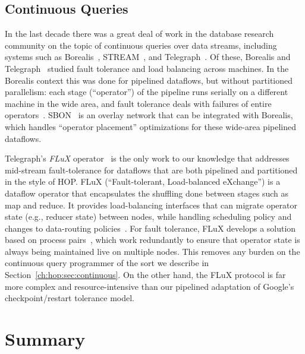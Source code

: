 \subsection{Continuous Queries}
In the last decade there was a great deal of work in the database research
community on the topic of continuous queries over data streams, including
systems such as Borealis~\cite{borealis}, STREAM~\cite{stream}, and
Telegraph~\cite{tcq-cidr}.  Of these, Borealis and Telegraph~\cite{flux-ft}
studied fault tolerance and load balancing across machines.  In the Borealis
context this was done for pipelined dataflows, but without partitioned
parallelism: each stage (``operator'') of the pipeline runs serially on a
different machine in the wide area, and fault tolerance deals with failures of
entire operators~\cite{borealisFT}.  SBON~\cite{sbon} is an overlay network that
can be integrated with Borealis, which handles ``operator placement''
optimizations for these wide-area pipelined dataflows.

Telegraph's \emph{FLuX} operator~\cite{flux-ft,flux-lb} is the only work to our
knowledge that addresses mid-stream fault-tolerance for dataflows that are both
pipelined and partitioned in the style of HOP\@. FLuX (``Fault-tolerant,
Load-balanced eXchange'') is a dataflow operator that encapsulates the shuffling
done between stages such as map and reduce.  It provides load-balancing
interfaces that can migrate operator state (e.g., reducer state) between nodes,
while handling scheduling policy and changes to data-routing
policies~\cite{flux-lb}.  For fault tolerance, FLuX develops a solution based on
process pairs~\cite{flux-ft}, which work redundantly to ensure that operator
state is always being maintained live on multiple nodes.  This removes any
burden on the continuous query programmer of the sort we describe in
Section~\ref{ch:hop:sec:continuous}.  On the other hand, the FLuX protocol is far more
complex and resource-intensive than our pipelined adaptation of Google's
checkpoint/restart tolerance model.

\section{Summary}


